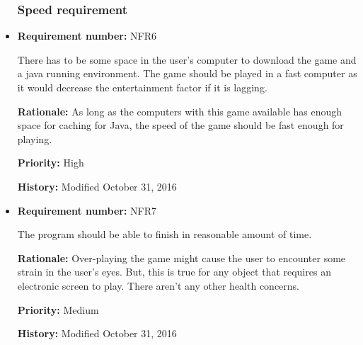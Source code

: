 \documentclass[12pt,letterpaper]{article}
\begin{document}
\begin{reqbox}
	\begin{itemize}
\subsubsection{Speed requirement}

\item \textbf{Requirement number: }NFR6

   	There has to be some space in the user’s computer to download the game and a java running environment. The game should be played in a fast computer as it would decrease the entertainment factor if it is lagging.

		\textbf{Rationale: } As long as the computers with this game available has enough space for caching for Java, the speed of the game should be fast enough for playing.

		\textbf{Priority: }High

		\textbf{History: }Modified October 31, 2016

	\end{itemize}
\end{reqbox}

\begin{reqbox}
	\begin{itemize}

\subsubsection{Safety critical requirement}

\item \textbf{Requirement number: }NFR7

	The program should be able to finish in reasonable amount of time.  

		\textbf{Rationale: } Over-playing the game might cause the user to encounter some strain in the user’s eyes. But, this is true for any object that requires an electronic screen to play. There aren’t any other health concerns.

		\textbf{Priority: }Medium

		\textbf{History: }Modified October 31, 2016

	\end{itemize}
\end{reqbox}
\end{document}
